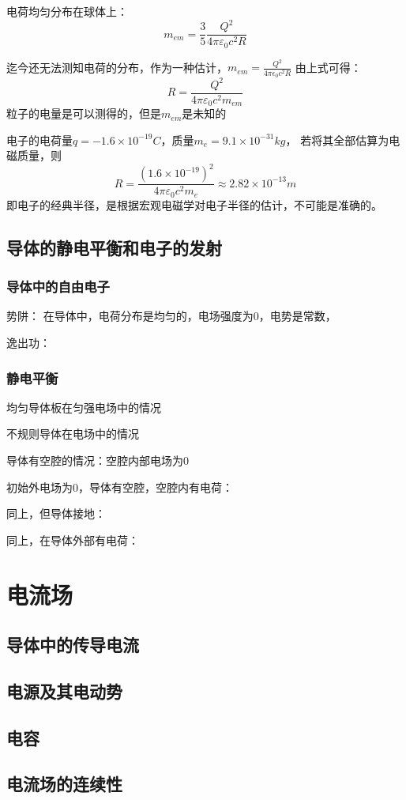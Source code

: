 \documentclass[11pt]{ctexart}
\begin{document}
电荷均匀分布在球体上：
\begin{equation}
    m_{em}=\frac{3}{5} \frac{Q^2}{4 \pi \varepsilon_0 c^2 R}
\end{equation}

迄今还无法测知电荷的分布，作为一种估计，$m_{em}=\frac{Q^2}{4 \pi \epsilon_0 c^2 R}
$
由上式可得：
\begin{equation}
    R=\frac{Q^2}{4 \pi \varepsilon_0 c^2 m_{em}}
\end{equation}
粒子的电量是可以测得的，但是$m_{em}$是未知的

电子的电荷量$q=-1.6 \times 10^{-19} C$，质量$m_e=9.1 \times 10^{-31} kg$，
若将其全部估算为电磁质量，则
\begin{equation}
    R=\frac{(1.6 \times 10^{-19})^2}{4 \pi \varepsilon_0 c^2 m_e} \approx 2.82 \times 10^{-13} m
\end{equation}
即电子的经典半径，是根据宏观电磁学对电子半径的估计，不可能是准确的。

\subsection{导体的静电平衡和电子的发射}
\subsubsection{导体中的自由电子}
势阱： 在导体中，电荷分布是均匀的，电场强度为0，电势是常数，

逸出功：

\subsubsection{静电平衡}
均匀导体板在匀强电场中的情况

不规则导体在电场中的情况

导体有空腔的情况：空腔内部电场为0

初始外电场为0，导体有空腔，空腔内有电荷：

同上，但导体接地：

同上，在导体外部有电荷：

\section{电流场}
\subsection{导体中的传导电流}
\subsection{电源及其电动势}
\subsection{电容}
\subsection{电流场的连续性}
\end{document}

